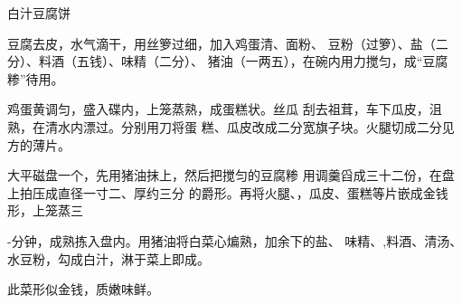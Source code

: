 \begin{recipe}[金钱豆腐]{白汁豆腐饼}

\ingredients


\cooking

\step 豆腐去皮，水气滴干，用丝箩过细，加入鸡蛋清、面粉、 豆粉（过箩）、盐（二分）、料酒（五钱）、味精（二分）、 猪油（一两五），在碗内用力搅匀，成“豆腐糁”待用。

\step 鸡蛋黄调匀，盛入碟内，上笼蒸熟，成蛋糕状。丝瓜 刮去祖茸，车下瓜皮，沮熟，在清水内漂过。分别用刀将蛋 糕、瓜皮改成二分宽旗子块。火腿切成二分见方的薄片。

\step 大平磁盘一个，先用猪油抹上，然后把搅匀的豆腐糁 用调羹舀成三十二份，在盘上拍压成直径一寸二、厚约三分 的爵形。再将火腿、，瓜皮、蛋糕等片嵌成金钱形，上笼蒸三

-分钟，成熟拣入盘内。用猪油将白菜心煸熟，加余下的盐、 味精、,料酒、清汤、水豆粉，勾成白汁，淋于菜上即成。

\notes

此菜形似金钱，质嫩味鲜。

\end{recipe}

